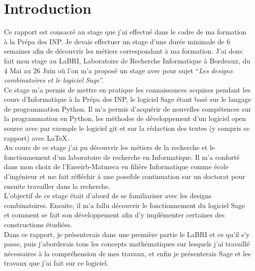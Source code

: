 \documentclass[a4paper]{article}
\begin{document}
\section*{Introduction}
Ce rapport est consacré au stage que j'ai effectué dans le cadre de ma formation à la Prépa des INP. Je devais effectuer un stage d'une durée minimale de 6 semaines afin de découvrir les métiers correspondant à ma formation.
J'ai donc fait mon stage au LaBRI, Laboratoire de Recherche Informatique à Bordeaux, du 4 Mai au 26 Juin où l'on m'a proposé un stage avec pour sujet ``\textit{Les designs combinatoires et le logiciel Sage}''.\\
Ce stage m'a permis de mettre en pratique les connaissances acquises pendant les cours d'Informatique à la Prépa des INP, le logiciel Sage étant basé sur le langage de programmation Python. Il m'a permis d'acquérir de nouvelles compétences sur la programmation en Python, les méthodes de développement d'un logiciel open source avec par exemple le logiciel git et sur la rédaction des textes (y compris ce rapport) avec \LaTeX.\\
Au cours de ce stage j'ai pu découvrir les métiers de la recherche et le fonctionnement d'un laboratoire de recherche en Informatique. Il m'a conforté dans mon choix de l'Enseirb-Matmeca en filière Informatique comme école d'ingénieur et me fait réfléchir à une possible continuation sur un doctorat pour ensuite travailler dans la recherche.\\
L'objectif de ce stage était d'abord de se familiariser avec les designs combinatoires. Ensuite, il m'a fallu découvrir le fonctionnement du logiciel Sage et comment se fait son développement afin d'y implémenter certaines des constructions étudiées.\bigskip \\
Dans ce rapport, je présenterais dans une première partie le LaBRI et ce qu'il s'y passe, puis j'aborderais tous les concepts mathématiques sur lesquels j'ai travaillé nécessaires à la compréhension de mes travaux, et enfin je présenterais Sage et les travaux que j'ai fait sur ce logiciel. 
\newpage
\end{document}
